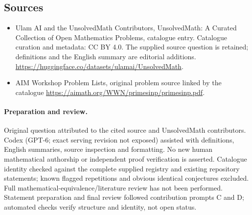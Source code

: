 \documentclass[11pt]{article}
\begin{document}
\subsection{Sources}
\begin{itemize}
\item[\hypertarget{source:statement:1}{S1}] Ulam AI and the UnsolvedMath Contributors, UnsolvedMath: A Curated Collection of Open Mathematics Problems, catalogue entry. Catalogue curation and metadata: CC BY 4.0. The supplied source question is retained; definitions and the English summary are editorial additions.
\url{https://huggingface.co/datasets/ulamai/UnsolvedMath}.
\item[\hypertarget{source:statement:2}{S2}] AIM Workshop Problem Lists, original problem source linked by the catalogue
\url{https://aimath.org/WWN/primesinp/primesinp.pdf}.
\end{itemize}
\paragraph{Preparation and review.}
Original question attributed to the cited source and UnsolvedMath contributors. Codex (GPT-6; exact serving revision not exposed) assisted with definitions, English summaries, source inspection and formatting. No new human mathematical authorship or independent proof verification is asserted. Catalogue identity checked against the complete supplied registry and existing repository statements; known flagged repetitions and obvious identical conjectures excluded. Full mathematical-equivalence/literature review has not been performed. Statement preparation and final review followed contribution prompts C and D; automated checks verify structure and identity, not open status.
\label{end:statement}
\end{document}
